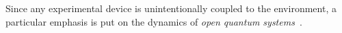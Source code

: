 \begin{comment}

Out-of-equilibrium dynamic phenomena at
phase transitions, such as hysteresis and coarsening,
Kibble-Zurek (KZ) 
\cite{kibble1976topology,kibble1980some,zurek1985cosmological,zurek1996cosmological}
defect production, aging, etc., have
been addressed in a variety of contexts, both
experimentally and theoretically, at classical and quantum
phase transitions (see, e.g., Refs. 
\cite{binder1987theory, cui2020experimentally, bray2002theory, weiler2008spontaneous,
dziarmaga2010dynamics, PSSV-2011-noneqcoll, ulm2013observation} 
and references therein). Out-of-equilibrium scaling behaviors generally
emerge when slowly crossing a critical point, i.e. in
the large scale limit. They depend on the nature of the
classical or quantum transition, its universality class,
and the type of critical dynamics in classical systems, see e.g. Refs. 
\cite{kibble1980some, zurek1996cosmological, dziarmaga2010dynamics, PSSV-2011-noneqcoll}. 
Therefore, slow (quasi-adiabatic) passages through critical points allow us to
probe the universal features of the long-range modes
emerging at thermal and quantum critical phenomena \cite{tarantelli2022out}. 

In particular, the first part of this
work analyzes the application of a round-trip KZ protocol across a continuous quantum
phase transition. We take as paradigmatic model a Kitaev chain \cite{Kitaev-2001} in 
which the chemical potential changes linearity in time, following the function $t/t_s$ 
with the time $t$ and the time scale $t_s$.\\

\end{comment}




Since any experimental device is unintentionally coupled to the environment, a particular emphasis is put on the dynamics of \textit{open quantum systems}~\cite{BP-openquantumsystembook}.

